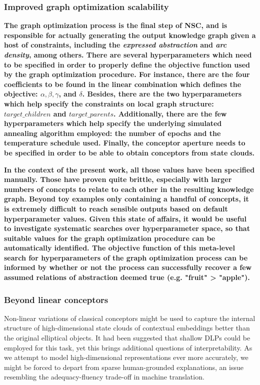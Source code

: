 \subsubsection{Improved graph optimization scalability}

\textbf{The graph optimization process is the final step of NSC, and is responsible for actually generating the output knowledge graph given a host of constraints, including the \textit{expressed abstraction} and \textit{arc density}, among others. There are several hyperparameters which need to be specified in order to properly define the objective function used by the graph optimization procedure. For instance, there are the four coefficients to be found in the linear combination which defines the objective: $\alpha, \beta, \gamma$, and $\delta$. Besides, there are the two hyperparameters which help specify the constraints on local graph structure: $target\_children$ and $target\_parents$. Additionally, there are the few hyperparameters which help specify the underlying simulated annealing algorithm employed: the number of epochs and the temperature schedule used. Finally, the conceptor aperture needs to be specified in order to be able to obtain conceptors from state clouds.}

\textbf{In the context of the present work, all those values have been specified manually. Those have proven quite brittle, especially with larger numbers of concepts to relate to each other in the resulting knowledge graph. Beyond toy examples only containing a handful of concepts, it is extremely difficult to reach sensible outputs based on default hyperparameter values. Given this state of affairs, it would be useful to investigate systematic searches over hyperparameter space, so that suitable values for the graph optimization procedure can be automatically identified. The objective function of this meta-level search for hyperparameters of the graph optimization process can be informed by whether or not the process can successfully recover a few assumed relations of abstraction deemed true (e.g. "fruit" > "apple").}

\subsubsection{Beyond linear conceptors}

Non-linear variations of classical conceptors might be used to capture the internal structure of high-dimensional state clouds of contextual embeddings better than the original elliptical objects. It had been suggested that shallow DLPs could be employed for this task, yet this brings additional questions of interpretability. As we attempt to model high-dimensional representations ever more accurately, we might be forced to depart from sparse human-grounded explanations, an issue resembling the adequacy-fluency trade-off in machine translation.

